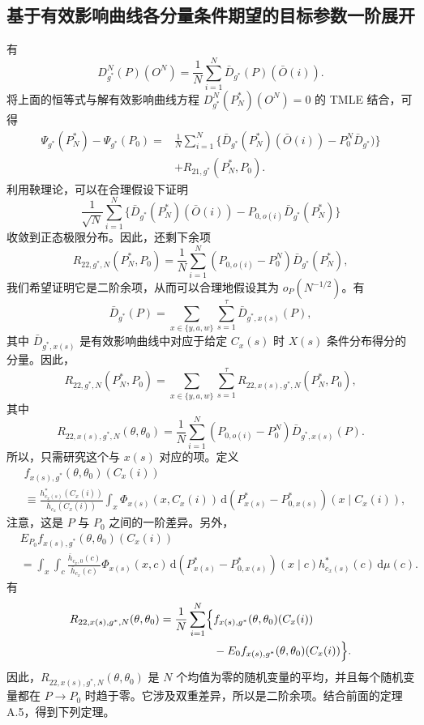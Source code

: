 
\subsection{基于有效影响曲线各分量条件期望的目标参数一阶展开}

有
\[
D^N_{g^*}(P)(O^N)=\frac1N\sum_{i=1}^N\bar D_{g^*}(P)(\bar O(i)).
\]
将上面的恒等式与解有效影响曲线方程
$D^N_{g^*}(P_N^*)(O^N)=0$ 的 TMLE 结合，可得
\[
\begin{aligned}
\Psi_{g^*}(P_N^*)-\Psi_{g^*}(P_0)
={}&\frac1N\sum_{i=1}^N\{\bar D_{g^*}(P_N^*)(\bar O(i))-P_0^N\bar D_{g^*})\}\\
&+R_{21,g^*}(P_N^*,P_0).
\end{aligned}
\]
利用鞅理论，可以在合理假设下证明
\[
\frac1{\sqrt N}\sum_{i=1}^N
 \{\bar D_{g^*}(P_N^*)(\bar O(i))-P_{0,o(i)}\bar D_{g^*}(P_N^*)\}
\]
收敛到正态极限分布。因此，还剩下余项
\[
R_{22,g^*,N}(P_N^*,P_0)
 =\frac1N\sum_{i=1}^N(P_{0,o(i)}-P_0^N)\bar D_{g^*}(P_N^*),
\]
我们希望证明它是二阶余项，从而可以合理地假设其为 $o_P(N^{-1/2})$。有
\[
\bar D_{g^*}(P)=\sum_{x\in\{y,a,w\}}\sum_{s=1}^{\tau}\bar D_{g^*,x(s)}(P),
\]
其中 $\bar D_{g^*,x(s)}$ 是有效影响曲线中对应于给定 $C_x(s)$ 时 $X(s)$ 条件分布得分的分量。因此，
\[
R_{22,g^*,N}(P_N^*,P_0)
 =\sum_{x\in\{y,a,w\}}\sum_{s=1}^{\tau}R_{22,x(s),g^*,N}(P_N^*,P_0),
\]
其中
\[
R_{22,x(s),g^*,N}(\theta,\theta_0)
 =\frac1N\sum_{i=1}^N(P_{0,o(i)}-P_0^N)\bar D_{g^*,x(s)}(P).
\]
所以，只需研究这个与 $x(s)$ 对应的项。定义
\[
\begin{aligned}
&f_{x(s),g^*}(\theta,\theta_0)(C_x(i))\\
&\equiv\frac{h^*_{c_x(s)}(C_x(i))}{\bar h_{c_x}(C_x(i))}
 \int_x\Phi_{x(s)}(x,C_x(i))
 \,\mathrm d(P^*_{x(s)}-P^*_{0,x(s)})(x\mid C_x(i)),
\end{aligned}
\]
注意，这是 $P$ 与 $P_0$ 之间的一阶差异。另外，
\[
\begin{aligned}
&E_{P_0}f_{x(s),g^*}(\theta,\theta_0)(C_x(i))\\
&=\int_x\int_c\frac{\bar h_{c_x,0}(c)}{\bar h_{c_x}(c)}
 \Phi_{x(s)}(x,c)\,\mathrm d(P^*_{x(s)}-P^*_{0,x(s)})(x\mid c)
 h^*_{c_x(s)}(c)\,\mathrm d\mu(c).
\end{aligned}
\]
有
\[
\begin{aligned}
R_{22,x(s),g^*,N}(\theta,\theta_0)
=\frac1N\sum_{i=1}^N\Bigl\{
&f_{x(s),g^*}(\theta,\theta_0)(C_x(i))\\
&-E_0f_{x(s),g^*}(\theta,\theta_0)(C_x(i))\Bigr\}.
\end{aligned}
\]
因此，$R_{22,x(s),g^*,N}(\theta,\theta_0)$ 是 $N$ 个均值为零的随机变量的平均，并且每个随机变量都在 $P\to P_0$ 时趋于零。它涉及双重差异，所以是二阶余项。结合前面的定理 A.5，得到下列定理。

